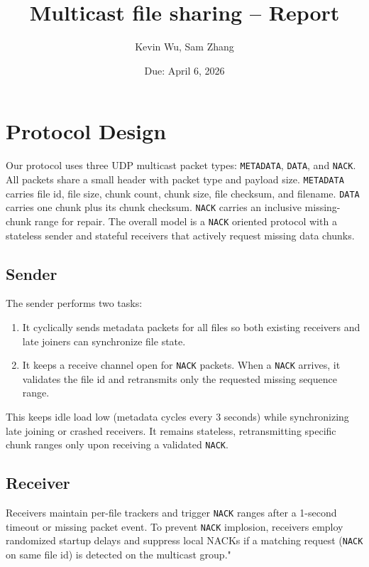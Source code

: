 \documentclass{article}
\title{Multicast file sharing -- Report}
\author{Kevin Wu, Sam Zhang}
\date{Due: April 6, 2026}
\begin{document}
\maketitle

\setlength{\parindent}{0ex} 
\setlength{\parskip}{5pt} %

\newpage

\section*{Protocol Design}

Our protocol uses three UDP multicast packet types: \texttt{METADATA}, \texttt{DATA}, and \texttt{NACK}. All packets share a small header with packet type and payload size. \texttt{METADATA} carries file id, file size, chunk count, chunk size, file checksum, and filename. \texttt{DATA} carries one chunk plus its chunk checksum. \texttt{NACK} carries an inclusive missing-chunk range for repair. The overall model is a \texttt{NACK} oriented protocol with a stateless sender and stateful receivers that actively request missing data chunks.


\subsection*{Sender}

The sender performs two tasks:

\begin{enumerate}
	\item It cyclically sends metadata packets for all files so both existing receivers and late joiners can synchronize file state.

	\item It keeps a receive channel open for \texttt{NACK} packets. When a \texttt{NACK} arrives, it validates the file id and retransmits only the requested missing sequence range.
\end{enumerate}

This keeps idle load low (metadata cycles every 3 seconds) while synchronizing late joining or crashed receivers. It remains stateless, retransmitting specific chunk ranges only upon receiving a validated \texttt{NACK}.

\subsection*{Receiver}

Receivers maintain per-file trackers and trigger \texttt{NACK} ranges after a 1-second timeout or missing packet event. To prevent \texttt{NACK} implosion, receivers employ randomized startup delays and suppress local NACKs if a matching request (\texttt{NACK} on same file id) is detected on the multicast group."
\end{document}

